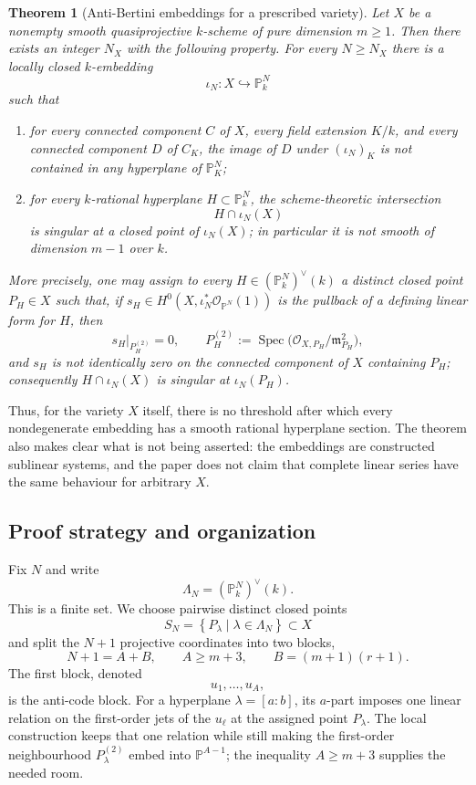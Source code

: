 \documentclass{lms}
\newtheorem{theorem}{Theorem}[section]
\newenvironment{romanlist}
  {\begin{enumerate}[iii]\renewcommand{\theenumi}{\textup{(\roman{enumi})}}}
  {\end{enumerate}}
\DeclareMathOperator{\Spec}{Spec}
\newcommand{\PP}{\mathbb P}
\newcommand{\OO}{\mathcal O}
\newcommand{\mm}{\mathfrak m}
\newcommand{\set}[1]{\left\{#1\right\}}
\begin{document}
\begin{theorem}[Anti-Bertini embeddings for a prescribed variety]\label{thm:main}
Let $X$ be a nonempty smooth quasiprojective $k$-scheme of pure dimension $m\ge 1$.  Then there exists an integer $N_X$ with the following property.  For every $N\ge N_X$ there is a locally closed $k$-embedding
\[
        \iota_N:X\hookrightarrow \PP^N_k
\]
such that
\begin{romanlist}
\item for every connected component $C$ of $X$, every field extension $K/k$, and every connected component $D$ of $C_K$, the image of $D$ under $(\iota_N)_K$ is not contained in any hyperplane of $\PP^N_K$;
\item for every $k$-rational hyperplane $H\subset \PP^N_k$, the scheme-theoretic intersection
\[
        H\cap \iota_N(X)
\]
is singular at a closed point of $\iota_N(X)$; in particular it is not smooth of dimension $m-1$ over $k$.
\end{romanlist}
More precisely, one may assign to every $H\in(\PP^N_k)^\vee(k)$ a distinct closed point $P_H\in X$ such that, if $s_H\in H^0(X,\iota_N^*\OO_{\PP^N}(1))$ is the pullback of a defining linear form for $H$, then
\[
        s_H\big|_{P_H^{(2)}}=0,
        \qquad
        P_H^{(2)}:=\Spec\bigl(\OO_{X,P_H}/\mm_{P_H}^2\bigr),
\]
and $s_H$ is not identically zero on the connected component of $X$ containing $P_H$; consequently $H\cap\iota_N(X)$ is singular at $\iota_N(P_H)$.
\end{theorem}

Thus, for the variety $X$ itself, there is no threshold after which every nondegenerate embedding has a smooth rational hyperplane section.  The theorem also makes clear what is not being asserted: the embeddings are constructed sublinear systems, and the paper does not claim that complete linear series have the same behaviour for arbitrary $X$.

\subsection{Proof strategy and organization}

Fix $N$ and write
\[
        \Lambda_N=(\PP^N_k)^\vee(k).
\]
This is a finite set.  We choose pairwise distinct closed points
\[
        S_N=\set{P_\lambda\mid \lambda\in\Lambda_N}\subset X
\]
and split the $N+1$ projective coordinates into two blocks,
\[
        N+1=A+B,
        \qquad
        A\ge m+3,
        \qquad
        B=(m+1)(r+1).
\]
The first block, denoted
\[
        u_1,\ldots,u_A,
\]
is the anti-code block.  For a hyperplane $\lambda=[a:b]$, its $a$-part imposes one linear relation on the first-order jets of the $u_\ell$ at the assigned point $P_\lambda$.  The local construction keeps that one relation while still making the first-order neighbourhood $P_\lambda^{(2)}$ embed into $\PP^{A-1}$; the inequality $A\ge m+3$ supplies the needed room.
\end{document}
